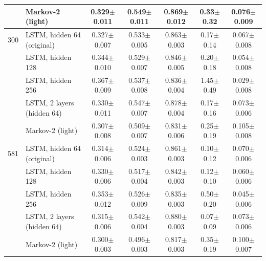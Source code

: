 \begin{table}[!t]
\begin{tabular}{llccccc}
 & Markov-2 (light) & 0.329$\pm$0.011 & 0.549$\pm$0.011 & 0.869$\pm$0.012 & 0.33$\pm$0.32 & 0.076$\pm$0.009 \\
\midrule
300 & LSTM, hidden 64 (original) & 0.327$\pm$0.007 & 0.533$\pm$0.005 & 0.863$\pm$0.003 & 0.17$\pm$0.14 & 0.067$\pm$0.008 \\
 & LSTM, hidden 128 & 0.344$\pm$0.010 & 0.529$\pm$0.007 & 0.846$\pm$0.005 & 0.20$\pm$0.18 & 0.054$\pm$0.008 \\
 & LSTM, hidden 256 & 0.367$\pm$0.009 & 0.537$\pm$0.008 & 0.836$\pm$0.004 & 1.45$\pm$0.49 & 0.029$\pm$0.008 \\
 & LSTM, 2 layers (hidden 64) & 0.330$\pm$0.011 & 0.547$\pm$0.007 & 0.878$\pm$0.004 & 0.17$\pm$0.16 & 0.073$\pm$0.006 \\
 & Markov-2 (light) & 0.307$\pm$0.008 & 0.509$\pm$0.007 & 0.831$\pm$0.006 & 0.25$\pm$0.19 & 0.105$\pm$0.008 \\
\midrule
581 & LSTM, hidden 64 (original) & 0.314$\pm$0.006 & 0.524$\pm$0.003 & 0.861$\pm$0.003 & 0.10$\pm$0.12 & 0.070$\pm$0.006 \\
 & LSTM, hidden 128 & 0.330$\pm$0.006 & 0.517$\pm$0.004 & 0.842$\pm$0.003 & 0.12$\pm$0.10 & 0.060$\pm$0.006 \\
 & LSTM, hidden 256 & 0.353$\pm$0.012 & 0.526$\pm$0.009 & 0.835$\pm$0.003 & 0.50$\pm$0.20 & 0.045$\pm$0.006 \\
 & LSTM, 2 layers (hidden 64) & 0.315$\pm$0.006 & 0.542$\pm$0.004 & 0.880$\pm$0.003 & 0.07$\pm$0.09 & 0.073$\pm$0.006 \\
 & Markov-2 (light) & 0.300$\pm$0.003 & 0.496$\pm$0.003 & 0.817$\pm$0.003 & 0.35$\pm$0.19 & 0.100$\pm$0.007 \\
\bottomrule
\end{tabular}
\end{table}